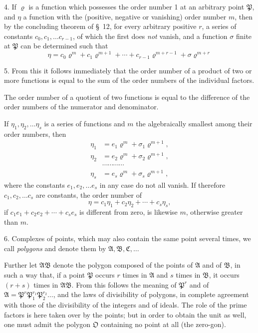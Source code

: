 \documentclass{article}
\begin{document}
4. If $\varrho$ is a function which possesses the order number 1 at an arbitrary point $\mathfrak{P}$, and $\eta$ a function with the (positive, negative or vanishing) order number $m$, then by the concluding theorem of §~12, for every arbitrary positive $r$, a series of constants $c_{0}, c_{1}, \ldots c_{r-1}$, of which the first does \emph{not} vanish, and a function $\sigma$ finite at $\mathfrak{P}$ can be determined such that
\[ \eta = c_{0}\varrho^{m} + c_{1}\varrho^{m+1} + \cdots + c_{r-1}\varrho^{m+r-1} + \sigma\varrho^{m+r} \]


5. From this it follows immediately that the order number of a product of two or more functions is equal to the sum of the order numbers of the individual factors.

The order number of a quotient of two functions is equal to the difference of the order numbers of the numerator and denominator.

If $\eta_{1}, \eta_{2}, \ldots \eta_{s}$ is a series of functions and $m$ the algebraically smallest among their order numbers, then
\[ \begin{aligned} \eta_{1} &= e_{1}\varrho^{m} + \sigma_{1}\varrho^{m+1}, \\ \eta_{2} &= e_{2}\varrho^{m} + \sigma_{2}\varrho^{m+1}, \\ &\cdots\cdots\cdots\cdots \\ \eta_{s} &= e_{s}\varrho^{m} + \sigma_{s}\varrho^{m+1}, \end{aligned} \]
where the constants $e_{1}, e_{2}, \ldots e_{s}$ in any case do not all vanish. If therefore $c_{1}, c_{2}, \ldots c_{s}$ are constants, the order number of
\[ \eta = c_{1}\eta_{1} + c_{2}\eta_{2} + \cdots + c_{s}\eta_{s}, \]
if $c_{1}e_{1} + c_{2}e_{2} + \cdots + c_{s}e_{s}$ is different from zero, is likewise $m$, otherwise greater than $m$.

6. Complexes of points, which may also contain the same point several times, we call \emph{polygons} and denote them by $\mathfrak{A}, \mathfrak{B}, \mathfrak{C}, \ldots$

Further let $\mathfrak{A}\mathfrak{B}$ denote the polygon composed of the points of $\mathfrak{A}$ and of $\mathfrak{B}$, in such a way that, if a point $\mathfrak{P}$ occurs $r$ times in $\mathfrak{A}$ and $s$ times in $\mathfrak{B}$, it occurs $(r+s)$ times in $\mathfrak{A}\mathfrak{B}$. From this follows the meaning of $\mathfrak{P}^{r}$ and of $\mathfrak{A} = \mathfrak{P}^{r}\mathfrak{P}_{1}^{r_{1}}\mathfrak{P}_{2}^{r_{2}}\ldots$, and the laws of divisibility of polygons, in complete agreement with those of the divisibility of the integers and of ideals. The role of the prime factors is here taken over by the points; but in order to obtain the unit as well, one must admit the polygon $\mathfrak{O}$ containing no point at all (the zero-gon).
\end{document}
